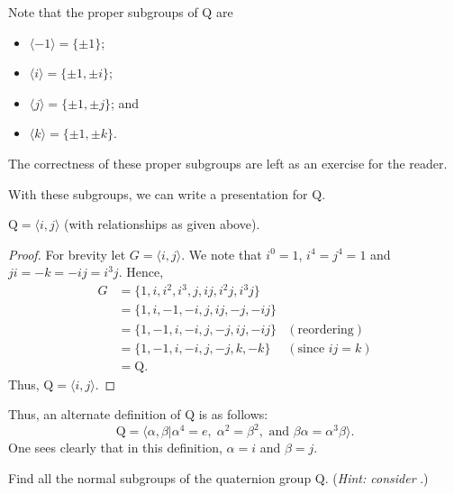 \newpage

Note that the proper subgroups of $\mathrm{Q}$ are
\begin{multicols}{2}
    \begin{itemize}
        \item $\langle -1 \rangle = \{\pm1\}$;
        \item $\langle i \rangle = \{\pm1, \pm i\}$;
        \item $\langle j \rangle = \{\pm1, \pm j\}$; and
        \item $\langle k \rangle = \{\pm1, \pm k\}$.
    \end{itemize}
\end{multicols}
The correctness of these proper subgroups are left as an exercise for the reader.

With these subgroups, we can write a presentation for $\mathrm{Q}$.

\begin{proposition}
    $\mathrm{Q} = \langle i, j \rangle$ (with relationships as given above).
\end{proposition}
\begin{proof}
    For brevity let $G = \langle i, j \rangle$. We note that $i^0 = 1$, $i^4 = j^4 = 1$ and $ji = -k = -ij = i^3j$. Hence,
    \begin{align*}
        G &= \{1, i, i^2, i^3, j, ij, i^2j, i^3j\}\\
        &= \{1, i, -1, -i, j, ij, -j, -ij\}\\
        &= \{1, -1, i, -i, j, -j, ij, -ij\} & (\text{reordering})\\
        &= \{1, -1, i, -i, j, -j, k, -k\} & (\text{since } ij = k)\\
        &= \mathrm{Q}.
    \end{align*}
    Thus, $\mathrm{Q} = \langle i, j \rangle$.
\end{proof}

Thus, an alternate definition of $\mathrm{Q}$ is as follows:
\[
    \mathrm{Q} = \langle \alpha, \beta \vert \alpha^4 = e,\; \alpha^2 = \beta^2, \text{ and } \beta\alpha = \alpha^3\beta \rangle.
\]
One sees clearly that in this definition, $\alpha = i$ and $\beta = j$.

\begin{exercise}\label{exercise-normal-subgroups-of-quarternion-group}
    Find all the normal subgroups of the quaternion group $\mathrm{Q}$.\newline
    (\textit{Hint: consider }.)
\end{exercise}

